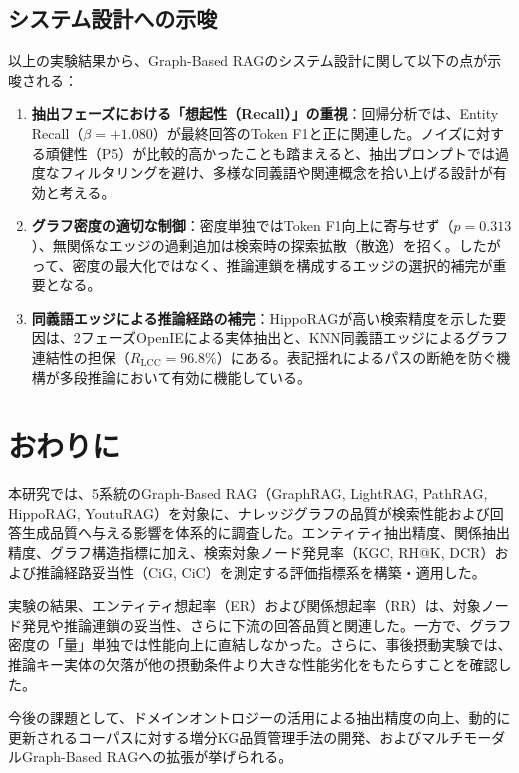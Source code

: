 \documentclass[a4j,dvipdfmx]{jsarticle}
\begin{document}
\subsection{システム設計への示唆}
以上の実験結果から、Graph-Based RAGのシステム設計に関して以下の点が示唆される：
\begin{enumerate}
    \item \textbf{抽出フェーズにおける「想起性（Recall）」の重視}：回帰分析では、Entity Recall（$\beta = +1.080$）が最終回答のToken F1と正に関連した。ノイズに対する頑健性（P5）が比較的高かったことも踏まえると、抽出プロンプトでは過度なフィルタリングを避け、多様な同義語や関連概念を拾い上げる設計が有効と考える。
    \item \textbf{グラフ密度の適切な制御}：密度単独ではToken F1向上に寄与せず（$p = 0.313$）、無関係なエッジの過剰追加は検索時の探索拡散（散逸）を招く。したがって、密度の最大化ではなく、推論連鎖を構成するエッジの選択的補完が重要となる。
    \item \textbf{同義語エッジによる推論経路の補完}：HippoRAGが高い検索精度を示した要因は、2フェーズOpenIEによる実体抽出と、KNN同義語エッジによるグラフ連結性の担保（$R_{\text{LCC}} = 96.8\%$）にある。表記揺れによるパスの断絶を防ぐ機構が多段推論において有効に機能している。
\end{enumerate}


\section{おわりに}

本研究では、5系統のGraph-Based RAG（GraphRAG, LightRAG, PathRAG, HippoRAG, YoutuRAG）を対象に、ナレッジグラフの品質が検索性能および回答生成品質へ与える影響を体系的に調査した。エンティティ抽出精度、関係抽出精度、グラフ構造指標に加え、検索対象ノード発見率（KGC, RH@K, DCR）および推論経路妥当性（CiG, CiC）を測定する評価指標系を構築・適用した。

実験の結果、エンティティ想起率（ER）および関係想起率（RR）は、対象ノード発見や推論連鎖の妥当性、さらに下流の回答品質と関連した。一方で、グラフ密度の「量」単独では性能向上に直結しなかった。さらに、事後摂動実験では、推論キー実体の欠落が他の摂動条件より大きな性能劣化をもたらすことを確認した。

今後の課題として、ドメインオントロジーの活用による抽出精度の向上、動的に更新されるコーパスに対する増分KG品質管理手法の開発、およびマルチモーダルGraph-Based RAGへの拡張が挙げられる。

\small


\end{document}
